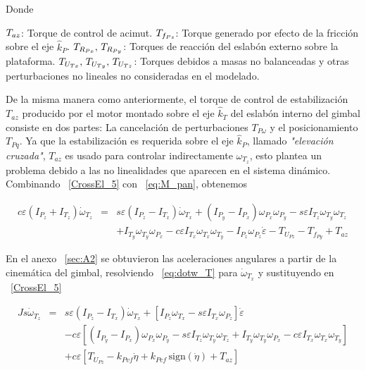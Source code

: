 Donde

$\\T_{az}$: Torque de control de acimut.
$\\T_{f_{Pz}}$: Torque generado por efecto de la fricci\'{o}n sobre el eje $\hat{k}_{P}$.
$\\T_{R_{Px}}, \, T_{R_{Py}}$: Torques de reacci\'{o}n del eslab\'{o}n externo sobre la plataforma.
$\\T_{U_{Tx}}, \, T_{U_{Ty}}, \, T_{U_{Tz}}$: Torques debidos a masas no balanceadas y otras perturbaciones no lineales no consideradas en el modelado.\newline 

De la misma manera como anteriormente, el torque de control de estabilizaci\'{o}n $T_{az}$ producido por el motor montado sobre el eje $\hat{k}_{T}$ del eslab\'{o}n interno del gimbal consiste en dos partes: La cancelaci\'{o}n de perturbaciones $T_{P\omega}$ y el posicionamiento $T_{Pq}$. Ya que la estabilizaci\'{o}n es requerida sobre el eje  
$\hat{k}_{P}$, llamado \textit{"elevaci\'{o}n cruzada"}, $T_{az}$ es usado para controlar indirectamente $\omega_{T_z}$, esto plantea un problema debido a las no linealidades que aparecen en el sistema din\'{a}mico. Combinando ~\ref{CrossEl_5} con ~\ref{eq:M_pan}, obtenemos

\begin{equation}
\begin{array}{rcl}
c\varepsilon \left( I_{P_z}+I_{T_z} \right)\dot{\omega}_{T_z}&=&s\varepsilon \left( I_{P_z}-I_{T_x} \right)\dot{\omega}_{T_x} + \left( I_{P_y}-I_{P_x} \right) \omega_{P_x} \omega_{P_y}- s\varepsilon I_{T_z} \omega_{T_y} \omega_{T_z}\\
 & &  + I_{T_y} \omega_{T_y} \omega_{P_x} - c\varepsilon I_{T_x} \omega_{T_x} \omega_{T_y} - I_{P_z} \omega_{P_z}\dot{\varepsilon}-T_{U_{Pz}}-T_{f_{Py}}+T_{az}
 \end{array}
 \label{CrossEl_6}
\end{equation}

En el anexo ~\ref{sec:A2} se obtuvieron las aceleraciones angulares a partir de la cinem\'{a}tica del gimbal, resolviendo ~\ref{eq:dotw_T} para $\dot{\omega}_{T_x}$ y sustituyendo en ~\ref{CrossEl_5}

\begin{equation}
\begin{array}{rcl}
Js\dot{\omega}_{T_z}&=&s\varepsilon \left( I_{P_z}-I_{T_x} \right)\dot{\omega}_{T_x} + \left[ I_{P_z} \omega_{T_x} - s\varepsilon I_{T_x} \omega_{P_z} \right]\dot{\varepsilon}\\

 & &-c\varepsilon\left[ \left( I_{P_y}-I_{P_x} \right) \omega_{P_x} \omega_{P_y}- s\varepsilon I_{T_z} \omega_{T_y} \omega_{T_z} + I_{T_y} \omega_{T_y} \omega_{P_x} - c\varepsilon I_{T_x} \omega_{T_x} \omega_{T_y}\right] \\
 
 & &  + c\varepsilon\left[T_{U_{Pz}}-k_{Pvf}\dot{\eta }+k_{Pcf} \, \mathrm{sign}\left( \dot{\eta} \right) + T_{az} \right]
 \end{array}
 \label{CrossEl_7}
\end{equation}

